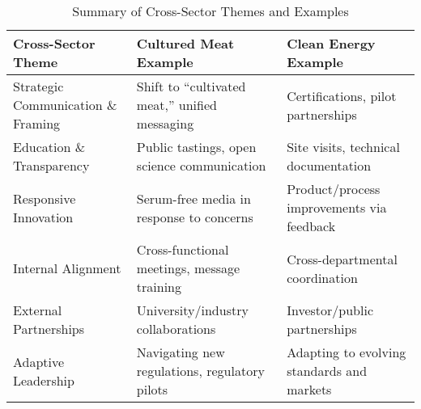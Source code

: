 \begin{table}[h!]
	\centering
	\caption{Summary of Cross-Sector Themes and Examples}
	\label{tab:cross_sector_summary}
	\begin{tabularx}{\textwidth}{@{}lXX@{}}
		\toprule
		\textbf{Cross-Sector Theme} & \textbf{Cultured Meat Example} & \textbf{Clean Energy Example} \\
		\midrule
		Strategic Communication \& Framing & Shift to “cultivated meat,” unified messaging & Certifications, pilot partnerships \\
		\addlinespace
		Education \& Transparency & Public tastings, open science communication & Site visits, technical documentation \\
		\addlinespace
		Responsive Innovation & Serum-free media in response to concerns & Product/process improvements via feedback \\
		\addlinespace
		Internal Alignment & Cross-functional meetings, message training & Cross-departmental coordination \\
		\addlinespace
		External Partnerships & University/industry collaborations & Investor/public partnerships \\
		\addlinespace
		Adaptive Leadership & Navigating new regulations, regulatory pilots & Adapting to evolving standards and markets \\
		\bottomrule
	\end{tabularx}
\end{table}
